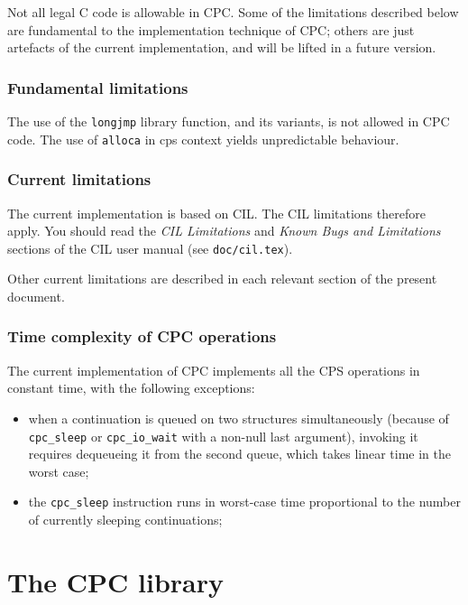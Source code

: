 \documentclass[a4paper]{report}
\begin{document}
Not all legal C code is allowable in CPC.  Some of the limitations
described below are fundamental to the implementation technique of
CPC; others are just artefacts of the current implementation, and will
be lifted in a future version.

\subsection{Fundamental limitations}

The use of the {\tt longjmp} library function, and its variants, is
not allowed in CPC code.  The use of \texttt{alloca} in cps context
yields unpredictable behaviour.

\subsection{Current limitations}

The current implementation is based on CIL.  The CIL limitations
therefore apply.  You should read the \textit{CIL Limitations} and
\textit{Known Bugs and Limitations} sections of the CIL user manual
(see \texttt{doc/cil.tex}).

Other current limitations are described in each relevant section of the
present document.

\subsection{Time complexity of CPC operations}

The current implementation of CPC implements all the CPS operations in
constant time, with the following exceptions:
\begin{itemize} 
\item when a continuation is queued on two structures simultaneously
  (because of {\tt cpc\_sleep} or {\tt cpc\_io\_wait} with a non-null
  last argument), invoking it requires dequeueing it from the second
  queue, which takes linear time in the worst case;
\item the {\tt cpc\_sleep} instruction runs in worst-case time
  proportional to the number of currently sleeping continuations;
\end{itemize}

\chapter{The CPC library}
\end{document}
